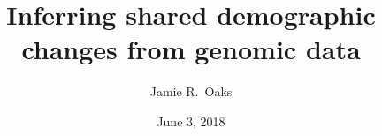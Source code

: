 \title[Shared demographic changes]{
    Inferring shared demographic changes from
    genomic data}

\author[Jamie Oaks]{
    Jamie R.\ Oaks
}

\date{June 3, 2018}
